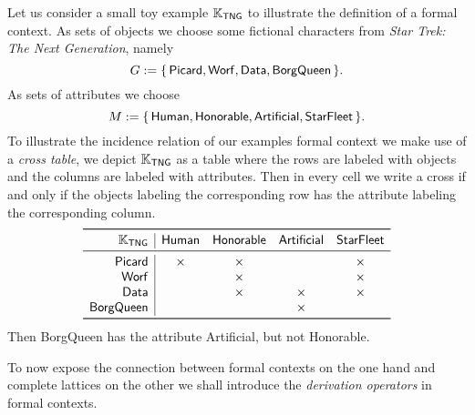 \begin{Example}
  \label{expl:star-trek}
  Let us consider a small toy example ${\mathbb{K}}_{\mathsf{TNG}}$ to illustrate the definition
  of a formal context.  As sets of objects we choose some fictional characters from
  \emph{Star Trek: The Next Generation}, namely
  \begin{equation*}
    G := {\{\, \mathsf{Picard}, \mathsf{Worf}, \mathsf{Data}, \mathsf{BorgQueen} \,\}}.
  \end{equation*}
  As sets of attributes we choose
  \begin{equation*}
    M := {\{\, \mathsf{Human}, \mathsf{Honorable}, \mathsf{Artificial}, \mathsf{Star
        Fleet} \,\}}.
  \end{equation*}
  To illustrate the incidence relation of our examples formal context we make use of a
  \emph{cross table}, \ie we depict ${\mathbb{K}}_{\mathsf{TNG}}$ as a table where the rows are
  labeled with objects and the columns are labeled with attributes.  Then in every cell we
  write a cross if and only if the objects labeling the corresponding row has the
  attribute labeling the corresponding column.
  \begin{equation*}
    \def\x{\times}
    \begin{array}{r|*{4}{c}}
      \toprule
      \con K_{\mathsf{TNG}} & \mathsf{Human} & \mathsf{Honorable} & \mathsf{Artificial} & \mathsf{Star Fleet} \\
      \midrule
      \mathsf{Picard} & \x & \x & & \x \\
      \mathsf{Worf} & & \x & & \x \\
      \mathsf{Data} & & \x & \x & \x \\
      \mathsf{BorgQueen} & & & \x & \\
      \bottomrule
    \end{array}
  \end{equation*}
  Then \textsf{BorgQueen} has the attribute \textsf{Artificial}, but not \textsf{Honorable}.
\end{Example}

To now expose the connection between formal contexts on the one hand and complete lattices
on the other we shall introduce the \emph{derivation operators} in formal contexts.

